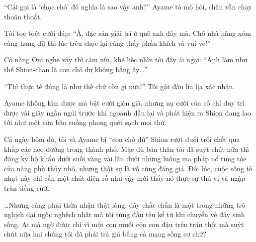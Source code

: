 \documentclass[../main.tex]{subfiles}
\begin{document}
``Cái gọi là `chọc chó' đó nghĩa là sao vậy anh?'' Ayame tò mò hỏi, chân vẫn chạy thoăn thoắt.

Tôi toe toét cười đáp: ``À, đặc sản giải trí ở quê anh đấy mà. Chó nhà hàng xóm càng hung dữ thì lúc trêu chọc lại càng thấy phấn khích và vui vẻ!''

Cô nàng Oni nghe vậy thì câm nín, khẽ liếc nhìn tôi đầy ái ngại: ``Anh làm như thể Shion-chan là con chó dữ không bằng ấy\dots''

``Thì thực tế đúng là như thế chứ còn gì nữa!'' Tôi gật đầu lia lịa xác nhận.

Ayame không kìm được mà bật cười giòn giã, nhưng nụ cười của cô chỉ duy trì được vài giây ngắn ngủi trước khi ngoảnh đầu lại và phát hiện ra Shion đang lao tới như một cơn bão cuồng phong quét sạch mọi thứ.

Cả ngày hôm đó, tôi và Ayame bị ``con chó dữ'' Shion rượt đuổi trối chết qua khắp các nẻo đường trong thành phố. Mặc dù bản thân tôi đã suýt chút nữa thì đăng ký hộ khẩu dưới suối vàng vài lần dưới những luồng ma pháp nổ tung tóe của nàng phù thủy nhỏ, nhưng thật sự là vô cùng đáng giá. Đôi lúc, cuộc sống tẻ nhạt này chỉ cần một chút điên rồ như vậy mới thấy nó thực sự thú vị và ngập tràn tiếng cười.

\dots Nhưng cũng phải thừa nhận thật lòng, đây chắc chắn là một trong những trò nghịch dại ngốc nghếch nhất mà tôi từng đầu têu kể từ khi chuyển về đây sinh sống. Ai mà ngờ được chỉ vì một con muỗi cỏn con đậu trên trán thôi mà suýt chút nữa hai chúng tôi đã phải trả giá bằng cả mạng sống cơ chứ?
\end{document}
